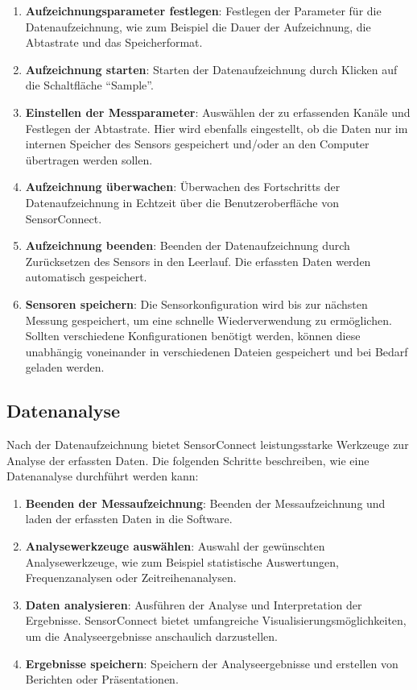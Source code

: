 \begin{enumerate}
    \item \textbf{Aufzeichnungsparameter festlegen}: Festlegen der Parameter für die Datenaufzeichnung, wie zum Beispiel die Dauer der Aufzeichnung, die Abtastrate und das Speicherformat.
    \item \textbf{Aufzeichnung starten}: Starten der Datenaufzeichnung durch Klicken auf die Schaltfläche ``Sample''.
    \item \textbf{Einstellen der Messparameter}: Auswählen der zu erfassenden Kanäle und Festlegen der Abtastrate. Hier wird ebenfalls eingestellt, ob die Daten nur im internen Speicher des Sensors gespeichert und/oder an den Computer übertragen werden sollen.
    \item \textbf{Aufzeichnung überwachen}: Überwachen des Fortschritts der Datenaufzeichnung in Echtzeit über die Benutzeroberfläche von SensorConnect.
    \item \textbf{Aufzeichnung beenden}: Beenden der Datenaufzeichnung durch Zurücksetzen des Sensors in den Leerlauf. Die erfassten Daten werden automatisch gespeichert.
    \item \textbf{Sensoren speichern}: Die Sensorkonfiguration wird bis zur nächsten Messung gespeichert, um eine schnelle Wiederverwendung zu ermöglichen. Sollten verschiedene Konfigurationen benötigt werden, können diese unabhängig voneinander in verschiedenen Dateien gespeichert und bei Bedarf geladen werden.
\end{enumerate}

\subsection{Datenanalyse}
Nach der Datenaufzeichnung bietet SensorConnect leistungsstarke Werkzeuge zur Analyse der erfassten Daten. Die folgenden Schritte beschreiben, wie eine Datenanalyse durchführt werden kann:

\begin{enumerate}
    \item \textbf{Beenden der Messaufzeichnung}: Beenden der Messaufzeichnung und laden der erfassten Daten in die Software.
    \item \textbf{Analysewerkzeuge auswählen}: Auswahl der gewünschten Analysewerkzeuge, wie zum Beispiel statistische Auswertungen, Frequenzanalysen oder Zeitreihenanalysen.
    \item \textbf{Daten analysieren}: Ausführen der Analyse und Interpretation der Ergebnisse. SensorConnect bietet umfangreiche Visualisierungsmöglichkeiten, um die Analyseergebnisse anschaulich darzustellen.
    \item \textbf{Ergebnisse speichern}: Speichern der Analyseergebnisse und erstellen von Berichten oder Präsentationen.
\end{enumerate}


